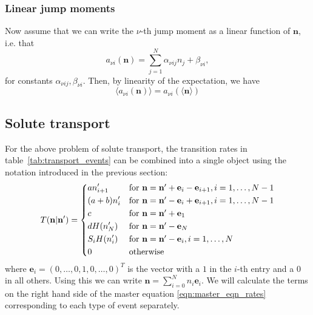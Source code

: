 \documentclass[a4paper,11pt]{article}
\numberwithin{equation}{section}
\newcommand{\V}[1]{\mathbf{#1}}
\newcommand{\E}[1]{\langle #1 \rangle}
\begin{document}
\subsubsection{Linear jump moments}
Now assume that we can write the \(\nu\)-th jump moment as a linear function of
\(\V{n}\), i.e. that
\begin{equation*}
    a_{\nu i}(\V{n}) = \sum_{j=1}^{N} \alpha_{\nu i j} n_j + \beta_{\nu i},
\end{equation*}
for constants \(\alpha_{\nu i j}, \beta_{\nu i}\).
Then, by linearity of the expectation, we have
\begin{equation}
    \E{a_{\nu i}(\V{n})} = a_{\nu i}(\E{\V{n}})
\end{equation}

\subsection{Solute transport}
For the above problem of solute transport, the transition rates in
table~\ref{tab:transport_events} can be combined into a single object using the
notation introduced in the previous section:
\begin{equation}
    \label{eqn:transition_rates_zeroth_order}
    T(\V{n}|\V{n}') =%
        \begin{dcases*}
            a n'_{i+1} & for \(\V{n} = \V{n}' + \V{e}_i - \V{e}_{i+1},
            i=1,\dotsc,N-1\)\\
            (a+b) n'_i & for \(\V{n} = \V{n}' - \V{e}_i + \V{e}_{i+1},
            i=1,\dotsc,N-1\)\\
            c & for \(\V{n} = \V{n}' + \V{e}_1\)\\
            d H(n'_N) & for \(\V{n} = \V{n}' - \V{e}_N\)\\
            S_i H(n'_i) & for \(\V{n} = \V{n}' - \V{e}_i, i=1,\dotsc,N\)\\
            0 & otherwise
        \end{dcases*}
\end{equation}
where \(\V{e}_i = (0,\dotsc,0,1,0,\dotsc,0)^T\) is the vector with a \(1\) in
the \(i\)-th entry and a \(0\) in all others. Using this we can write \(\V{n} =
\sum_{i=0}^{N} n_i \V{e}_i\). We will calculate the terms on the right hand side
of the master equation \eqref{eqn:master_eqn_rates} corresponding to each type
of event separately.
\end{document}
